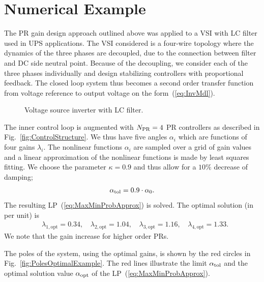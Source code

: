 \documentclass[conference,10pt]{IEEEtran}
\begin{document}
\section{Numerical Example}
\label{sec:numex}
The PR gain design approach outlined above was applied to a VSI with LC filter used in UPS applications.
The VSI considered is a four-wire topology where the dynamics of the three phases are decoupled, due to the connection between filter and DC side neutral point. Because of the decoupling, we consider each of the three phases individually and design stabilizing controllers with proportional feedback. The closed loop system thus becomes a second order transfer function from voltage reference to output voltage on the form~(\ref{eq:InvMdl}).
\begin{figure}[!h]
\centering
{}
\psfrag{+}{\tiny{$+$}}
\scalebox{0.9}{

}
\caption{Voltage source inverter with LC filter.}
\label{fig:UPS_LC}
\end{figure}

The inner control loop is augmented with $N_{\rm PR} = 4$ PR controllers as described in Fig.~\ref{fig:ControlStructure}. We thus have five
angles $\alpha_i$ which are functions of four gains
$\lambda_i$. The nonlinear functions $\alpha_i$ are sampled over a grid of gain values and a linear approximation of the nonlinear functions is made by least squares fitting. We choose the parameter $\kappa = 0.9$ and thus allow for a $10\%$ decrease of  damping;
\begin{align*}
\alpha_{\rm tol} = 0.9\cdot\alpha_0.
\end{align*} 
The resulting LP~(\ref{eq:MaxMinProbApprox}) is solved. The optimal solution (in per unit) is
\begin{align*}
& \lambda_{1,\textrm{opt}} = 0.34, \,
& \lambda_{2,\textrm{opt}} = 1.04, \,
& \lambda_{3,\textrm{opt}} = 1.16, \,
& \lambda_{4,\textrm{opt}} = 1.33.
\end{align*} 
We note that the gain increase for higher order PRs.
 
    
The poles of the system, using the optimal gains, is shown by the red circles in Fig.~\ref{fig:PolesOptimalExample}. The red lines 
illustrate the limit $\alpha_{\rm tol}$ and the optimal solution value $\alpha_{\rm opt}$ of the LP~(\ref{eq:MaxMinProbApprox}).
\end{document}
